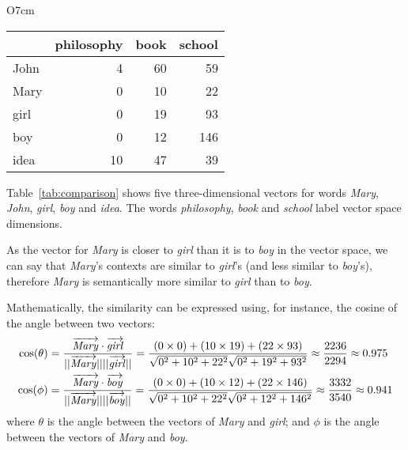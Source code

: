 \begin{wraptable}[9]{O}{7cm}
  \centering
  \vspace{-1em}
  \begin{tabular}{lrrr}
    \toprule
    & philosophy & book & school \\
    \midrule
    John & 4  & 60 & 59  \\
    Mary & 0  & 10 & 22  \\
    girl & 0  & 19 & 93  \\
    boy  & 0  & 12 & 146 \\
    idea & 10 & 47 & 39  \\
    \bottomrule
  \end{tabular}
  \caption{Word co-occurrence frequencies extracted from the BNC}
  \label{tab:comparison}
\end{wraptable}

Table~\ref{tab:comparison} shows five three-dimensional vectors for words \textit{Mary}, \textit{John}, \textit{girl}, \textit{boy} and \textit{idea}. The words \textit{philosophy}, \textit{book} and \textit{school} label vector space dimensions.

As the vector for \textit{Mary} is closer to \textit{girl} than it is to \textit{boy} in the vector space, we can say that \textit{Mary}'s contexts are similar to \textit{girl}'s (and less similar to \textit{boy}'s), therefore \textit{Mary} is semantically more similar to \textit{girl} than to \textit{boy}.

Mathematically, the similarity can be expressed using, for instance, the cosine of the angle between two vectors:
%
\begin{align*}
\cos(\theta) &=
\frac{\ov{\mathit{Mary}}\cdot\ov{\mathit{girl}}}
{||\ov{\mathit{Mary}}||||\ov{\mathit{girl}}||} =
%
\frac{(0\times0) + (10\times19) + (22\times93)}
%
%
%
{\sqrt{0^2 + 10^2 + 22^2}\sqrt{0^2 + 19^2 + 93^2}} \approx
\frac{2236}{2294} \approx 0.975
 \\
\cos(\phi) &=
\frac{\ov{\mathit{Mary}}\cdot\ov{\mathit{boy}}}
{||\ov{\mathit{Mary}}||||\ov{\mathit{boy}}||} =
%
\frac{(0\times0) + (10\times12) + (22\times146)}
{\sqrt{0^2 + 10^2 + 22^2}\sqrt{0^2 + 12^2 + 146^2}} \approx
\frac{3332}{3540} \approx 0.941
\end{align*}
%
where $\theta$ is the angle between the vectors of \textit{Mary} and \textit{girl}; and $\phi$ is the angle between the vectors of \textit{Mary} and \textit{boy}.

